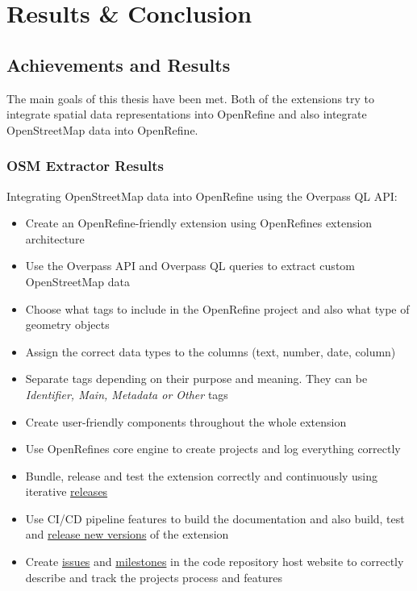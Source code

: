 \chapter{Results \& Conclusion}\label{ch:results-&-conclusion}
\section{Achievements and Results}
The main goals of this thesis have been met. Both of the extensions try to integrate spatial data representations into
OpenRefine and also integrate OpenStreetMap data into OpenRefine.
\subsection{OSM Extractor Results}
Integrating OpenStreetMap data into OpenRefine using the Overpass QL API:
\begin{itemize}
    \item Create an OpenRefine-friendly extension using OpenRefine\textquotesingle s extension architecture
    \item Use the Overpass API and Overpass QL queries to extract custom OpenStreetMap data
    \item Choose what tags to include in the OpenRefine project and also what type of geometry objects
    \item Assign the correct data types to the columns (text, number, date, column)
    \item Separate tags depending on their purpose and meaning. They can be \textit{Identifier, Main, Metadata or Other} tags
    \item Create user-friendly components throughout the whole extension
    \item Use OpenRefine\textquotesingle s core engine to create projects and log everything correctly
    \item Bundle, release and test the extension correctly and continuously using iterative \href{https://gitlab.com/labiangashi/osm-extractor/-/releases}{releases}
    \item Use CI/CD pipeline features to build the documentation and also build, test and \href{https://gitlab.com/labiangashi/osm-extractor/-/releases}{release new versions} of the extension
    \item Create \href{https://gitlab.com/labiangashi/osm-extractor/-/issues}{issues} and
    \href{https://gitlab.com/labiangashi/osm-extractor/-/milestones}{milestones} in the code repository host website to correctly describe and
    track the project\textquotesingle s process and features
\end{itemize}
